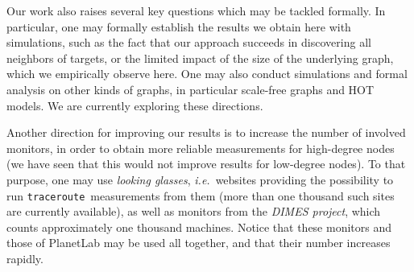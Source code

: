 \documentclass[conference]{IEEEtran}
\newcommand{\ie}{{\em i.e.}}
\newcommand{\traceroute}{{\tt traceroute}}
\begin{document}
Our work also raises several key questions which may be tackled formally. In particular, one may formally establish the results we obtain here with simulations, such as the fact that our approach succeeds in discovering all neighbors of targets, or the limited impact of the size of the underlying graph, which we empirically observe here.
One may also conduct simulations and formal analysis on other kinds of graphs, in particular scale-free graphs and HOT models. We are currently exploring these directions.

Another direction for improving our results is to increase the number of involved monitors, in order to obtain more reliable measurements for high-degree nodes (we have seen that this would not improve results for low-degree nodes). To that purpose, one may use {\em looking glasses}, \ie\ websites providing the possibility to run \traceroute\ measurements from them (more than one thousand such sites are currently available), as well as monitors from the \emph{DIMES project}, which counts approximately one thousand machines. Notice that these monitors and those of PlanetLab may be used all together, and that their number increases rapidly.




{%

%
%

}
\end{document}
